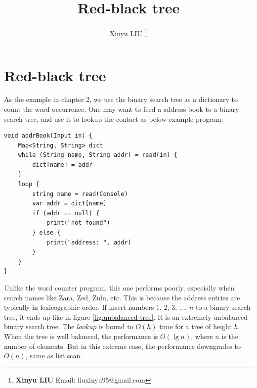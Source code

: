 \documentclass[b5paper]{article}
\begin{document}
\title{Red-black tree}

\author{Xinyu LIU
\thanks{{\bfseries Xinyu LIU} \newline
  Email: liuxinyu95@gmail.com \newline}
  }

\maketitle
\fi


\ifx\wholebook\relax
\chapter{Red-black tree}
\fi

As the example in chapter 2, we use the binary search tree as a dictionary to count the word occurrence. One may want to feed a address book to a binary search tree, and use it to lookup the contact as below example program:

\lstset{frame = single}
\begin{lstlisting}[language=Bourbaki]
void addrBook(Input in) {
    Map<String, String> dict
    while (String name, String addr) = read(in) {
        dict[name] = addr
    }
    loop {
        string name = read(Console)
        var addr = dict[name]
        if (addr == null) {
            print("not found")
        } else {
            print("address: ", addr)
        }
    }
}
\end{lstlisting}

Unlike the word counter program, this one performs poorly, especially when search names like Zara, Zed, Zulu, etc. This is because the address entries are typically in lexicographic order. If insert numbers 1, 2, 3, ..., $n$ to a binary search tree, it ends up like in figure \cref{fig:unbalanced-tree}. It is an extremely unbalanced binary search tree. The $lookup$ is bound to $O(h)$ time for a tree of height $h$. When the tree is well balanced, the performance is $O(\lg n)$, where $n$ is the number of elements. But in this extreme case, the performance downgrades to $O(n)$, same as list scan.
\end{document}
